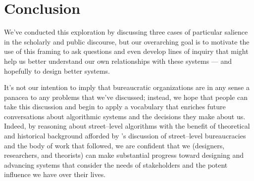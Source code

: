 \documentclass[street-level_algorithms]{subfiles}
\begin{document}
\section{Conclusion}
We've conducted this exploration by discussing
three cases of particular salience in the scholarly and public discourse,
but our overarching goal is to motivate the use of this framing
to ask questions and even develop lines of inquiry that might help us
better understand our own relationships with these systems
--- and hopefully to design better systems.

It's not our intention to imply that bureaucratic organizations are
in any sense a panacea to any problems that we've discussed;
instead, we hope that people can take this discussion and
begin to apply a vocabulary that enriches future conversations about
algorithmic systems and the decisions they make about us.
Indeed, by reasoning about street--level algorithms with the benefit of theoretical and historical background afforded by \citeauthor{lipsky1983street}'s discussion of street--level bureaucracies and the body of work that followed,
we are confident that we (designers, researchers, and theorists) can make substantial progress toward designing and advancing systems that consider the needs of stakeholders and the potent influence we have over their lives.




\end{document}
